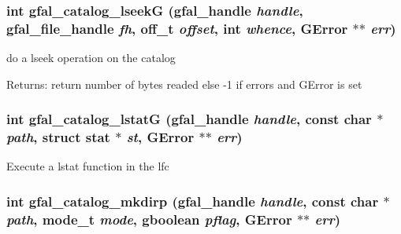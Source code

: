 \subsubsection{\setlength{\rightskip}{0pt plus 5cm}int gfal\_\-catalog\_\-lseek\-G (gfal\_\-handle {\em handle}, gfal\_\-file\_\-handle {\em fh}, off\_\-t {\em offset}, int {\em whence}, GError $\ast$$\ast$ {\em err})}\label{gfal__common__catalog_8c_f401436fd332c96ff3f9562d4e8be903}


do a lseek operation on the catalog \begin{Desc}
\item[Returns:]return number of bytes readed else -1 if errors and GError is set \end{Desc}
\subsubsection{\setlength{\rightskip}{0pt plus 5cm}int gfal\_\-catalog\_\-lstat\-G (gfal\_\-handle {\em handle}, const char $\ast$ {\em path}, struct stat $\ast$ {\em st}, GError $\ast$$\ast$ {\em err})}\label{gfal__common__catalog_8c_1ad1b1f96272dbf43a15e7ea5d35389d}


Execute a lstat function in the lfc 
\subsubsection{\setlength{\rightskip}{0pt plus 5cm}int gfal\_\-catalog\_\-mkdirp (gfal\_\-handle {\em handle}, const char $\ast$ {\em path}, mode\_\-t {\em mode}, gboolean {\em pflag}, GError $\ast$$\ast$ {\em err})}\label{gfal__common__catalog_8c_93da9b37bece0b034d80c17131761110}


